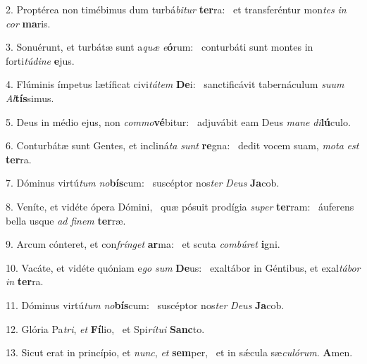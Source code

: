 2. Proptérea non timébimus dum turbá\textit{bi}\textit{tur} \textbf{ter}ra: \ast\  et transferéntur mon\textit{tes} \textit{in} \textit{cor} \textbf{ma}ris.\

3. Sonuérunt, et turbátæ sunt a\textit{quæ} \textit{e}\textbf{ó}rum: \ast\  conturbáti sunt montes in forti\textit{tú}\textit{di}\textit{ne} \textbf{e}jus.\

4. Flúminis ímpetus lætíficat civi\textit{tá}\textit{tem} \textbf{De}i: \ast\  sanctificávit tabernáculum \textit{su}\textit{um} \textit{Al}\textbf{tís}simus.\

5. Deus in médio ejus, non \textit{com}\textit{mo}\textbf{vé}bitur: \ast\  adjuvábit eam Deus \textit{ma}\textit{ne} \textit{di}\textbf{lú}culo.\

6. Conturbátæ sunt Gentes, et incliná\textit{ta} \textit{sunt} \textbf{re}gna: \ast\  dedit vocem suam, \textit{mo}\textit{ta} \textit{est} \textbf{ter}ra.\

7. Dóminus virtú\textit{tum} \textit{no}\textbf{bís}cum: \ast\  suscéptor nos\textit{ter} \textit{De}\textit{us} \textbf{Ja}cob.\

8. Veníte, et vidéte ópera Dómini, \dag\  quæ pósuit prodígia \textit{su}\textit{per} \textbf{ter}ram: \ast\  áuferens bella usque \textit{ad} \textit{fi}\textit{nem} \textbf{ter}ræ.\

9. Arcum cónteret, et con\textit{frín}\textit{get} \textbf{ar}ma: \ast\  et scuta \textit{com}\textit{bú}\textit{ret} \textbf{i}gni.\

10. Vacáte, et vidéte quóniam e\textit{go} \textit{sum} \textbf{De}us: \ast\  exaltábor in Géntibus, et exal\textit{tá}\textit{bor} \textit{in} \textbf{ter}ra.\

11. Dóminus virtú\textit{tum} \textit{no}\textbf{bís}cum: \ast\  suscéptor nos\textit{ter} \textit{De}\textit{us} \textbf{Ja}cob.\

12. Glória Pa\textit{tri}, \textit{et} \textbf{Fí}lio, \ast\  et Spi\textit{rí}\textit{tu}\textit{i} \textbf{Sanc}to.\

13. Sicut erat in princípio, et \textit{nunc}, \textit{et} \textbf{sem}per, \ast\  et in sǽcula sæ\textit{cu}\textit{ló}\textit{rum}. \textbf{A}men.\

